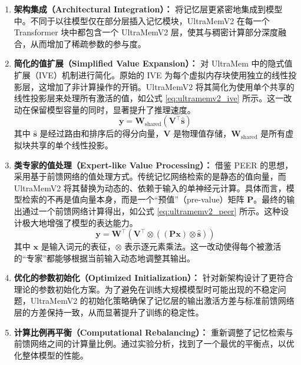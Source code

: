 \begin{enumerate}
    \item \textbf{架构集成（Architectural Integration）：} 将记忆层更紧密地集成到模型中。不同于以往模型仅在部分层插入记忆模块，UltraMemV2 在每一个 Transformer 块中都包含一个 UltraMemV2 层，使其与稠密计算部分深度融合，从而增加了稀疏参数的参与度。

    \item \textbf{简化的值扩展（Simplified Value Expansion）：} 对 UltraMem 中的隐式值扩展（IVE）机制进行简化。原始的 IVE 为每个虚拟内存块使用独立的线性投影层，这增加了非计算操作的开销。UltraMemV2 将其简化为使用单个共享的线性投影层来处理所有激活的值，如公式 \ref{eq:ultramemv2_ive} 所示。这一改动在保留模型容量的同时，显著提升了推理速度。
    \begin{equation}
        \boldsymbol{y} = \boldsymbol{W}_{\text{shared}} (\boldsymbol{V}^\top \hat{\boldsymbol{s}})
        \label{eq:ultramemv2_ive}
    \end{equation}
    其中 $\hat{\boldsymbol{s}}$ 是经过路由和排序后的得分向量，$\boldsymbol{V}$ 是物理值存储，$\boldsymbol{W}_{\text{shared}}$ 是所有虚拟块共享的单个线性投影。

    \item \textbf{类专家的值处理（Expert-like Value Processing）：} 借鉴 PEER 的思想，采用基于前馈网络的值处理方式。传统记忆网络检索的是静态的值向量，而 UltraMemV2 将其替换为动态的、依赖于输入的单神经元计算。具体而言，模型检索的不再是值向量本身，而是一个“预值”（pre-value）矩阵 $\boldsymbol{P}$。最终的输出通过一个前馈网络计算得出，如公式 \ref{eq:ultramemv2_peer} 所示。这种设计极大地增强了模型的表达能力。
    \begin{equation}
        \boldsymbol{y} = \boldsymbol{W}^\top (\boldsymbol{V}^\top \otimes ((\boldsymbol{P}\boldsymbol{x}) \otimes \hat{\boldsymbol{s}}))
        \label{eq:ultramemv2_peer}
    \end{equation}
    其中 $\boldsymbol{x}$ 是输入词元的表征，$\otimes$ 表示逐元素乘法。这一改动使得每个被激活的“专家”都能够根据当前输入动态地调整其输出。

    \item \textbf{优化的参数初始化（Optimized Initialization）：} 针对新架构设计了更符合理论的参数初始化方案。为了避免在训练大规模模型时可能出现的不稳定问题，UltraMemV2 的初始化策略确保了记忆层的输出激活方差与标准前馈网络层的方差保持一致，从而显著提升了训练的稳定性。

    \item \textbf{计算比例再平衡（Computational Rebalancing）：} 重新调整了记忆检索与前馈网络之间的计算量比例。通过实验分析，找到了一个最优的平衡点，以优化整体模型的性能。
\end{enumerate}

